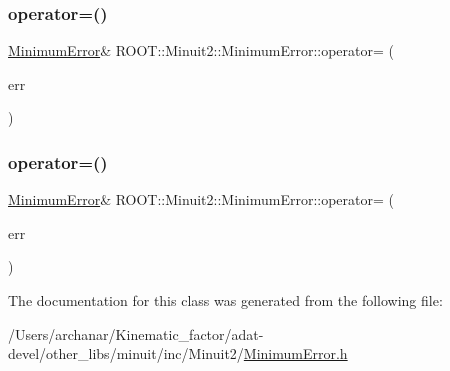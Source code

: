 \subsubsection{\texorpdfstring{operator=()}{operator=()}\hspace{0.1cm}{\footnotesize\ttfamily [2/3]}}
{\footnotesize\ttfamily \mbox{\hyperlink{classROOT_1_1Minuit2_1_1MinimumError}{Minimum\+Error}}\& R\+O\+O\+T\+::\+Minuit2\+::\+Minimum\+Error\+::operator= (\begin{DoxyParamCaption}\item[{const \mbox{\hyperlink{classROOT_1_1Minuit2_1_1MinimumError}{Minimum\+Error}} \&}]{err }\end{DoxyParamCaption})\hspace{0.3cm}{\ttfamily [inline]}}

\mbox{\label{classROOT_1_1Minuit2_1_1MinimumError_a991c1899c07aa31f7a61d77b648c07ad}} 
\subsubsection{\texorpdfstring{operator=()}{operator=()}\hspace{0.1cm}{\footnotesize\ttfamily [3/3]}}
{\footnotesize\ttfamily \mbox{\hyperlink{classROOT_1_1Minuit2_1_1MinimumError}{Minimum\+Error}}\& R\+O\+O\+T\+::\+Minuit2\+::\+Minimum\+Error\+::operator= (\begin{DoxyParamCaption}\item[{const \mbox{\hyperlink{classROOT_1_1Minuit2_1_1MinimumError}{Minimum\+Error}} \&}]{err }\end{DoxyParamCaption})\hspace{0.3cm}{\ttfamily [inline]}}



The documentation for this class was generated from the following file\+:\begin{DoxyCompactItemize}
\item 
/\+Users/archanar/\+Kinematic\+\_\+factor/adat-\/devel/other\+\_\+libs/minuit/inc/\+Minuit2/\mbox{\hyperlink{adat-devel_2other__libs_2minuit_2inc_2Minuit2_2MinimumError_8h}{Minimum\+Error.\+h}}\end{DoxyCompactItemize}
